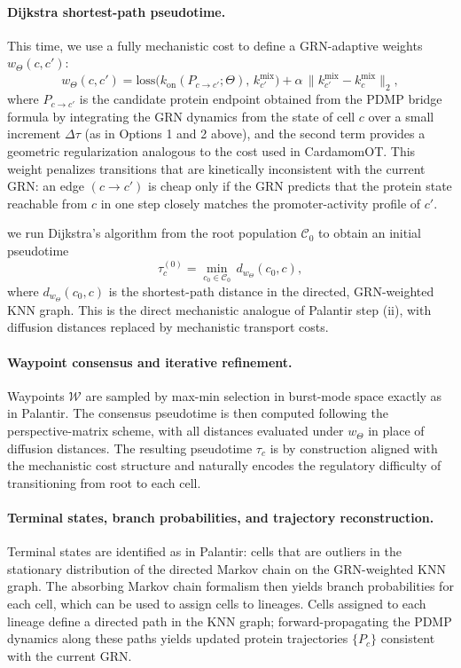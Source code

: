 \documentclass[10pt]{article}
\begin{document}
\paragraph{Dijkstra shortest-path pseudotime.}
This time, we use a fully mechanistic cost to define 
a GRN-adaptive weights $w_\Theta(c,c')$:
\[
    w_{\Theta}(c,c')
    =
    \mathrm{loss}\bigl(k_{\mathrm{on}}(P_{c \to c'};\Theta),\, k^{\mathrm{mix}}_{c'}\bigr)
    +
    \alpha\,\bigl\|k^{\mathrm{mix}}_{c'} - k^{\mathrm{mix}}_{c}\bigr\|_2,
\]
where $P_{c \to c'}$ is the candidate protein endpoint obtained from the PDMP bridge
formula by integrating the GRN dynamics from the state of cell $c$ over a small
increment $\Delta\tau$ (as in Options 1 and 2 above), and the second term provides
a geometric regularization analogous to the cost used in CardamomOT.  This weight
penalizes transitions that are kinetically inconsistent with the current GRN: an edge
$(c \to c')$ is cheap only if the GRN predicts that the protein state reachable from
$c$ in one step closely matches the promoter-activity profile of $c'$.

we run Dijkstra's algorithm from
the root population $\mathcal{C}_0$ to obtain an initial pseudotime
\[
    \tau^{(0)}_c
    =
    \min_{c_0 \in \mathcal{C}_0}\, d_{w_\Theta}(c_0, c),
\]
where $d_{w_\Theta}(c_0,c)$ is the shortest-path distance in the directed,
GRN-weighted KNN graph.  This is the direct mechanistic analogue of Palantir step
(ii), with diffusion distances replaced by mechanistic transport costs.

\paragraph{Waypoint consensus and iterative refinement.}
Waypoints $\mathcal{W}$ are sampled by max-min selection in burst-mode space exactly
as in Palantir.  The consensus pseudotime is then computed following the
perspective-matrix scheme, with all distances evaluated under $w_\Theta$ in place of
diffusion distances.  The resulting pseudotime $\tau_c$ is by construction aligned
with the mechanistic cost structure and naturally encodes the regulatory difficulty
of transitioning from root to each cell.

\paragraph{Terminal states, branch probabilities, and trajectory reconstruction.}
Terminal states are identified as in Palantir: cells that are outliers in the
stationary distribution of the directed Markov chain on the GRN-weighted KNN graph.
The absorbing Markov chain formalism then yields branch probabilities for each cell,
which can be used to assign cells to lineages.  Cells assigned to each lineage define
a directed path in the KNN graph; forward-propagating the PDMP dynamics along these
paths yields updated protein trajectories $\{P_c\}$ consistent with the current GRN.
\end{document}
